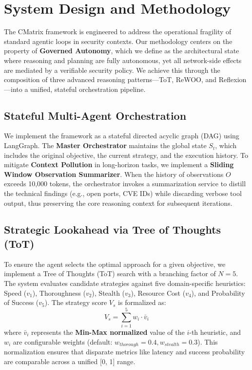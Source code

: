 \section{System Design and Methodology}

The CMatrix framework is engineered to address the operational fragility of standard agentic loops in security contexts. Our methodology centers on the property of \textbf{Governed Autonomy}, which we define as the architectural state where reasoning and planning are fully autonomous, yet all network-side effects are mediated by a verifiable security policy. We achieve this through the composition of three advanced reasoning patterns—ToT, ReWOO, and Reflexion—into a unified, stateful orchestration pipeline.

\subsection{Stateful Multi-Agent Orchestration}
We implement the framework as a stateful directed acyclic graph (DAG) using LangGraph. The \textbf{Master Orchestrator} maintains the global state $S_t$, which includes the original objective, the current strategy, and the execution history. 
To mitigate \textbf{Context Pollution} in long-horizon tasks, we implement a \textbf{Sliding Window Observation Summarizer}. When the history of observations $O$ exceeds 10,000 tokens, the orchestrator invokes a summarization service to distill the technical findings (e.g., open ports, CVE IDs) while discarding verbose tool output, thus preserving the core reasoning context for subsequent iterations.



\subsection{Strategic Lookahead via Tree of Thoughts (ToT)}
To ensure the agent selects the optimal approach for a given objective, we implement a Tree of Thoughts (ToT) search with a branching factor of $N=5$. 
The system evaluates candidate strategies against five domain-specific heuristics: Speed ($v_1$), Thoroughness ($v_2$), Stealth ($v_3$), Resource Cost ($v_4$), and Probability of Success ($v_5$). The strategy score $V_s$ is formalized as:
\begin{equation}
\label{eq:strategy-score}
V_s = \sum_{i=1}^{5} w_i \cdot \bar{v}_i
\end{equation}
where $\bar{v}_i$ represents the \textbf{Min-Max normalized} value of the $i$-th heuristic, and $w_i$ are configurable weights (default: $w_{thorough}=0.4, w_{stealth}=0.3$). This normalization ensures that disparate metrics like latency and success probability are comparable across a unified [0, 1] range.

